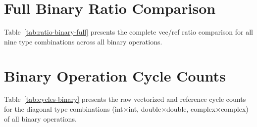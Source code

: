 
\section{Full Binary Ratio Comparison}

Table~\ref{tab:ratio-binary-full} presents the complete vec/ref ratio comparison for all nine type combinations across all binary operations.



\section{Binary Operation Cycle Counts}

Table~\ref{tab:cycles-binary} presents the raw vectorized and reference cycle counts for the diagonal type combinations (int$\times$int, double$\times$double, complex$\times$complex) of all binary operations.


